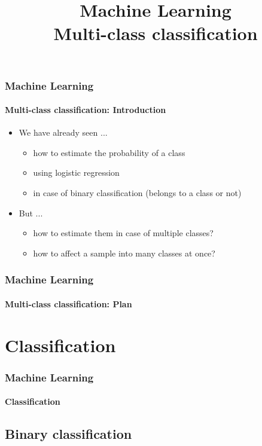 \documentclass[xcolor=table]{beamer}
\title[ML: Multi-class classification] %
{Machine Learning\\Multi-class classification}
\begin{document}
	
\begin{frame}
	\frametitle{Machine Learning}
	\framesubtitle{Multi-class classification: Introduction}
	
	\begin{itemize}
		\item We have already seen ...
		\begin{itemize}
			\item how to estimate the probability of a class
			\item using logistic regression
			\item in case of binary classification (belongs to a class or not)
		\end{itemize}
		\item But ...
		\begin{itemize}
			\item how to estimate them in case of multiple classes?
			\item how to affect a sample into many classes at once?
		\end{itemize}

	\end{itemize}
\end{frame}


\begin{frame}
	\frametitle{Machine Learning}
	\framesubtitle{Multi-class classification: Plan}
	
	\begin{multicols}{2}
		\tableofcontents
	\end{multicols}
\end{frame}

\section{Classification}

\begin{frame}
	\frametitle{Machine Learning}
	\framesubtitle{Classification}
	
	
\end{frame}

\subsection{Binary classification}
\end{document}
